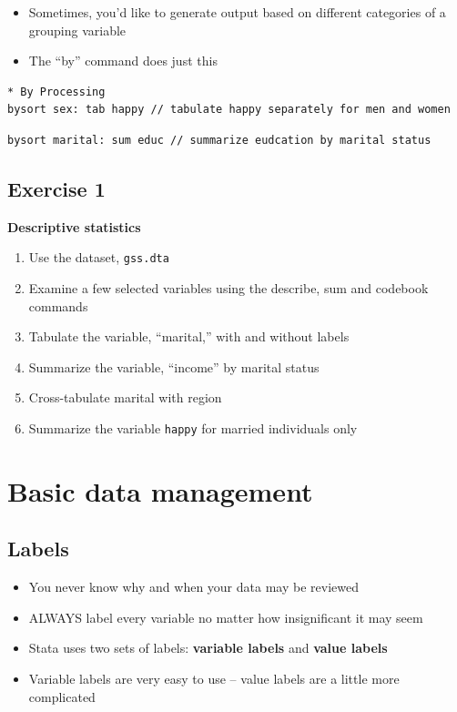 \documentclass[]{book}
\providecommand{\tightlist}{%
  \setlength{\itemsep}{0pt}\setlength{\parskip}{0pt}}
\begin{document}
\begin{itemize}
\tightlist
\item
  Sometimes, you'd like to generate output based on different categories
  of a grouping variable
\item
  The ``by'' command does just this
\end{itemize}

\begin{verbatim}
* By Processing
bysort sex: tab happy // tabulate happy separately for men and women
\end{verbatim}

\begin{verbatim}
bysort marital: sum educ // summarize eudcation by marital status
\end{verbatim}

\subsection{Exercise 1}\label{exercise-1-6}

\textbf{Descriptive statistics}

\begin{enumerate}
\def\labelenumi{\arabic{enumi}.}
\tightlist
\item
  Use the dataset, \texttt{gss.dta}
\item
  Examine a few selected variables using the describe, sum and codebook
  commands
\item
  Tabulate the variable, ``marital,'' with and without labels
\item
  Summarize the variable, ``income'' by marital status
\item
  Cross-tabulate marital with region
\item
  Summarize the variable \texttt{happy} for married individuals only
\end{enumerate}

\section{Basic data management}\label{basic-data-management}

\subsection{Labels}\label{labels}

\begin{itemize}
\tightlist
\item
  You never know why and when your data may be reviewed
\item
  ALWAYS label every variable no matter how insignificant it may seem
\item
  Stata uses two sets of labels: \textbf{variable labels} and
  \textbf{value labels}
\item
  Variable labels are very easy to use -- value labels are a little more
  complicated
\end{itemize}
\end{document}
